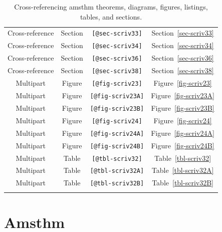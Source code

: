 \documentclass[
  12pt,
  a4paper,
  oneside,
  numbers=noenddot,
  titlepage,
  toclink=all,
  toc=bibliography]{scrbook}
\theoremstyle{definition}
\theoremstyle{definition}
\theoremstyle{definition}
\theoremstyle{plain}
\theoremstyle{plain}
\theoremstyle{plain}
\theoremstyle{plain}
\theoremstyle{plain}
\theoremstyle{remark}
\begin{document}
\begin{longtable}[]{@{}cccc@{}}
Cross-reference & Section & \texttt{{[}@sec-scriv33{]}} &
\protect\hypertarget{cite_38}{}{\label{cite_38}Section~\ref{sec-scriv33}} \\
Cross-reference & Section & \texttt{{[}@sec-scriv34{]}} &
\protect\hypertarget{cite_39}{}{\label{cite_39}Section~\ref{sec-scriv34}} \\
Cross-reference & Section & \texttt{{[}@sec-scriv36{]}} &
\protect\hypertarget{cite_40}{}{\label{cite_40}Section~\ref{sec-scriv36}} \\
Cross-reference & Section & \texttt{{[}@sec-scriv38{]}} &
\protect\hypertarget{cite_41}{}{\label{cite_41}Section~\ref{sec-scriv38}} \\
Multipart & Figure & \texttt{{[}@fig-scriv23{]}} &
\protect\hypertarget{cite_42}{}{\label{cite_42}Figure~\ref{fig-scriv23}} \\
Multipart & Figure & \texttt{{[}@fig-scriv23A{]}} &
\protect\hypertarget{cite_43}{}{\label{cite_43}Figure~\ref{fig-scriv23A}} \\
Multipart & Figure & \texttt{{[}@fig-scriv23B{]}} &
\protect\hypertarget{cite_44}{}{\label{cite_44}Figure~\ref{fig-scriv23B}} \\
Multipart & Figure & \texttt{{[}@fig-scriv24{]}} &
\protect\hypertarget{cite_45}{}{\label{cite_45}Figure~\ref{fig-scriv24}} \\
Multipart & Figure & \texttt{{[}@fig-scriv24A{]}} &
\protect\hypertarget{cite_46}{}{\label{cite_46}Figure~\ref{fig-scriv24A}} \\
Multipart & Figure & \texttt{{[}@fig-scriv24B{]}} &
\protect\hypertarget{cite_47}{}{\label{cite_47}Figure~\ref{fig-scriv24B}} \\
Multipart & Table & \texttt{{[}@tbl-scriv32{]}} &
\protect\hypertarget{cite_48}{}{\label{cite_48}Table~\ref{tbl-scriv32}} \\
Multipart & Table & \texttt{{[}@tbl-scriv32A{]}} &
\protect\hypertarget{cite_49}{}{\label{cite_49}Table~\ref{tbl-scriv32A}} \\
Multipart & Table & \texttt{{[}@tbl-scriv32B{]}} &
\protect\hypertarget{cite_50}{}{\label{cite_50}Table~\ref{tbl-scriv32B}} \\
\caption{\label{tbl-scriv3}Cross-referencing amsthm theorems, diagrams,
figures, listings, tables, and sections.}\tabularnewline
\end{longtable}

\newpage{}

\hypertarget{sec-scriv4}{%
\section{Amsthm}\label{sec-scriv4}}
\end{document}
